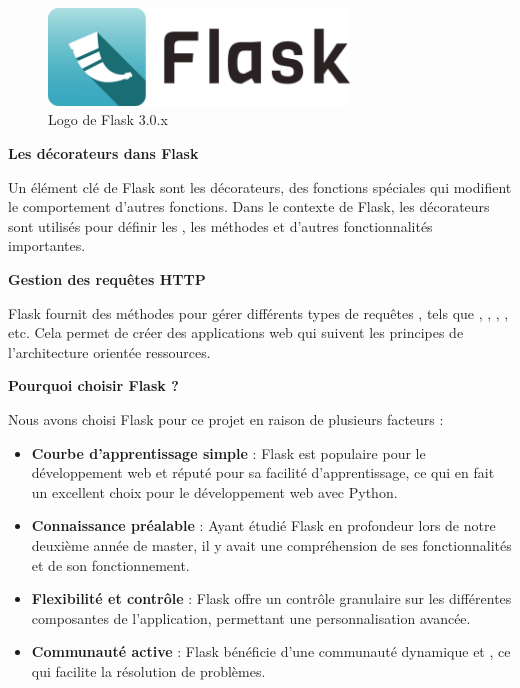         \begin{figure}[h!]
            \centering
            \includegraphics[width=8cm]{02_images/part_01/08_flask_logo_03.png}
            \caption{Logo de Flask 3.0.x}
        \end{figure}

        \textbf{Les décorateurs dans Flask}
        
        Un élément clé de Flask sont les décorateurs, des fonctions spéciales qui modifient le comportement d'autres fonctions. Dans le contexte de Flask, les décorateurs sont utilisés pour définir les , les méthodes  et d'autres fonctionnalités importantes.
        
        \textbf{Gestion des requêtes HTTP}
        
        Flask fournit des méthodes pour gérer différents types de requêtes , tels que , , , , etc. Cela permet de créer des applications web  qui suivent les principes de l'architecture orientée ressources.
        
        \textbf{Pourquoi choisir Flask ?}
        
        Nous avons choisi Flask pour ce projet en raison de plusieurs facteurs :
        
        \begin{itemize}
            \item \textbf{Courbe d'apprentissage simple} : Flask est populaire pour le développement web et réputé pour sa facilité d'apprentissage, ce qui en fait un excellent choix pour le développement web avec Python.
            \item \textbf{Connaissance préalable} : Ayant étudié Flask en profondeur lors de notre deuxième année de master, il y avait une compréhension de ses fonctionnalités et de son fonctionnement.
            \item \textbf{Flexibilité et contrôle} : Flask offre un contrôle granulaire sur les différentes composantes de l'application, permettant une personnalisation avancée.
            \item \textbf{Communauté active} : Flask bénéficie d'une communauté dynamique et , ce qui facilite la résolution de problèmes.
        \end{itemize}

